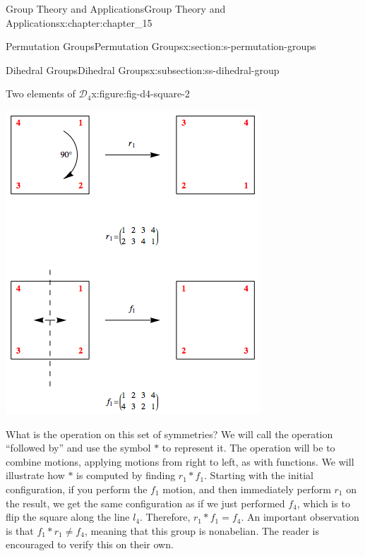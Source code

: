 \documentclass[twoside,10pt,]{book}
\numberwithin{equation}{section}
\begin{document}
\begin{chapterptx}{Group Theory and Applications}{}{Group Theory and Applications}{}{}{x:chapter:chapter_15}
\begin{sectionptx}{Permutation Groups}{}{Permutation Groups}{}{}{x:section:s-permutation-groups}
\begin{subsectionptx}{Dihedral Groups}{}{Dihedral Groups}{}{}{x:subsection:ss-dihedral-group}
\begin{figureptx}{Two elements of \(\mathcal{D}_4\)}{x:figure:fig-d4-square-2}{}
\begin{image}{0.15}{0.7}{0.15}
\includegraphics[width=\linewidth]{images/fig-d4-square-2.png}
\end{image}%
\tcblower
\end{figureptx}%
What is the operation on this set of symmetries?   We will call the operation ``followed by'' and use the symbol \(*\)  to represent it.  The operation will be to combine motions, applying motions from right to left, as with functions.  We will illustrate how \(*\) is computed by finding  \(r_1*f_1\).  Starting with the initial configuration, if you perform the \(f_1\) motion, and then immediately perform \(r_1\) on the result, we get the same configuration as if we just performed \(f_4\), which is to flip the square along the line \(l_4\).   Therefore, \(r_1*f_1 = f_4\).  An important observation is that \(f_1*r_1 \neq f_4\), meaning that this group is nonabelian. The reader is encouraged to verify this on their own.%
\par

\end{subsectionptx}
\end{sectionptx}
\end{chapterptx}
\end{document}
